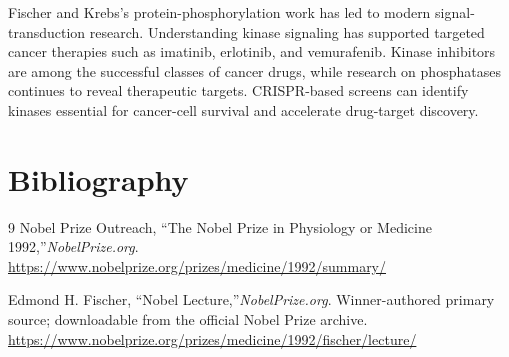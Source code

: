 Fischer and Krebs's protein-phosphorylation work has led to modern signal-transduction research. Understanding kinase signaling has supported targeted cancer therapies such as imatinib, erlotinib, and vemurafenib. Kinase inhibitors are among the successful classes of cancer drugs, while research on phosphatases continues to reveal therapeutic targets. CRISPR-based screens can identify kinases essential for cancer-cell survival and accelerate drug-target discovery.


\section{Bibliography}

\begin{thebibliography}{9}
Nobel Prize Outreach, ``The Nobel Prize in Physiology or Medicine 1992,''\emph{NobelPrize.org}.\\
\url{https://www.nobelprize.org/prizes/medicine/1992/summary/}

Edmond H. Fischer, ``Nobel Lecture,''\emph{NobelPrize.org}. Winner-authored primary source; downloadable from the official Nobel Prize archive.\\
\url{https://www.nobelprize.org/prizes/medicine/1992/fischer/lecture/}
\end{thebibliography}

